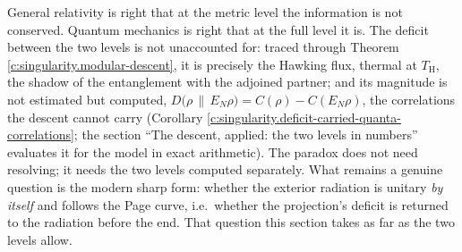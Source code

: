 \documentclass[11pt]{article}
\theoremstyle{definition}
\theoremstyle{plain}
\providecommand{\EN}{}\renewcommand{\EN}{E_{N}}
\providecommand{\TH}{}\renewcommand{\TH}{T_{\mathrm{H}}}
\providecommand{\rel}{}\renewcommand{\rel}[2]{D\bigl(#1 \,\|\, #2\bigr)}
\begin{document}
General relativity is right that at the metric level the information is not conserved. Quantum mechanics is right that at the full level it is. The deficit between the two levels is not unaccounted for: traced through Theorem \ref{c:singularity.modular-descent}, it is precisely the Hawking flux, thermal at $\TH$, the shadow of the entanglement with the adjoined partner; and its magnitude is not estimated but computed, $\rel{\rho}{\EN\rho} = C(\rho) - C(\EN\rho)$, the correlations the descent cannot carry (Corollary \ref{c:singularity.deficit-carried-quanta-correlations}; the section ``The descent, applied: the two levels in numbers'' evaluates it for the model in exact arithmetic). The paradox does not need resolving; it needs the two levels computed separately. What remains a genuine question is the modern sharp form: whether the exterior radiation is unitary \emph{by itself} and follows the Page curve, i.e.\ whether the projection's deficit is returned to the radiation before the end. That question this section takes as far as the two levels allow.
\end{document}

